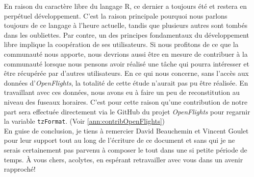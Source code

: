 En raison du caractère libre du langage R, ce dernier a toujours été et restera en perpétuel développement. C'est la raison principale pourquoi nous parlons toujours de ce langage à l'heure actuelle, tandis que plusieurs autres sont tombés dans les oubliettes. Par contre, un des principes fondamentaux du développement libre implique la coopération de ses utilisateurs. Si nous profitons de ce que la communauté nous apporte, nous devrions aussi être en mesure de contribuer à la communauté lorsque nous pensons avoir réalisé une tâche qui pourra intéresser et être récupérée par d'autres utilisateurs. En ce qui nous concerne, sans l'accès aux données d'\emph{OpenFlights}, la totalité de cette étude n'aurait pas pu être réalisée. En travaillant avec ces données, nous avons eu à faire un peu de reconstitution au niveau des fuseaux horaires. C'est pour cette raison qu'une contribution de notre part sera effectuée directement via le GitHub du projet \emph{OpenFlights} pour regarnir la variable \texttt{tzFormat}. (Voir \autoref{ann:contribOpenFlights})\\

En guise de conclusion, je tiens à remercier David Beauchemin et Vincent Goulet pour leur support tout au long de l'écriture de ce document et sans qui je ne serais certainement pas parvenu à composer le tout dans une si petite période de temps. À vous chers, acolytes, en espérant retravailler avec vous dans un avenir rapproché!